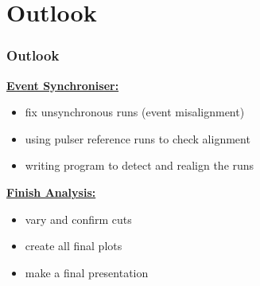 \documentclass[9pt]{beamer}
\begin{document}
\section{Outlook}
\begin{frame}
	\frametitle{Outlook}
	\underline{\textbf{Event Synchroniser:}}
	\begin{itemize}
		\setlength{\itemsep}{\fill}
		\item fix unsynchronous runs (event misalignment)
		\item using pulser reference runs to check alignment
		\item writing program to detect and realign the runs
	\end{itemize}
	\vspace*{10pt}
	\underline{\textbf{Finish Analysis:}}
	\begin{itemize}
		\setlength{\itemsep}{\fill}
		\item vary and confirm cuts 
		\item create all final plots
		\item make a final presentation
	\end{itemize}
\end{frame}
\end{document}
